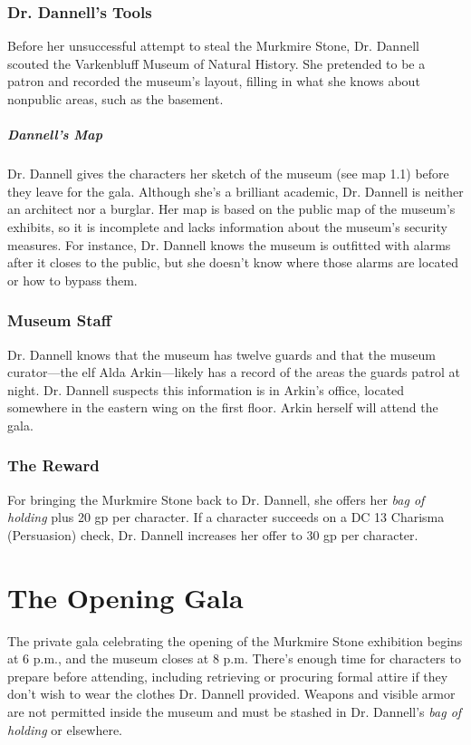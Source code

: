 \documentclass[10pt,a4paper,twoside,bg=print,twocolumn,openany,nodeprecatedcode]{dndbook}
\begin{document}
\subsubsection{Dr. Dannell's Tools}
Before her unsuccessful attempt to steal the Murkmire Stone, Dr. Dannell scouted the Varkenbluff Museum of Natural History. She pretended to be a patron and recorded the museum's layout, filling in what she knows about nonpublic areas, such as the basement.

\subparagraph{Dannell's Map}
Dr. Dannell gives the characters her sketch of the museum (see map 1.1) before they leave for the gala. Although she's a brilliant academic, Dr. Dannell is neither an architect nor a burglar. Her map is based on the public map of the museum's exhibits, so it is incomplete and lacks information about the museum's security measures. For instance, Dr. Dannell knows the museum is outfitted with alarms after it closes to the public, but she doesn't know where those alarms are located or how to bypass them.

\subsubsection{Museum Staff}
Dr. Dannell knows that the museum has twelve guards and that the museum curator—the elf Alda Arkin—likely has a record of the areas the guards patrol at night. Dr. Dannell suspects this information is in Arkin's office, located somewhere in the eastern wing on the first floor. Arkin herself will attend the gala.

\subsubsection{The Reward}
For bringing the Murkmire Stone back to Dr. Dannell, she offers her \textit{bag of holding} plus 20 gp per character. If a character succeeds on a DC 13 Charisma (Persuasion) check, Dr. Dannell increases her offer to 30 gp per character.

\section{The Opening Gala}
The private gala celebrating the opening of the Murkmire Stone exhibition begins at 6 p.m., and the museum closes at 8 p.m. There's enough time for characters to prepare before attending, including retrieving or procuring formal attire if they don't wish to wear the clothes Dr. Dannell provided. Weapons and visible armor are not permitted inside the museum and must be stashed in Dr. Dannell's \textit{bag of holding} or elsewhere.
\end{document}
